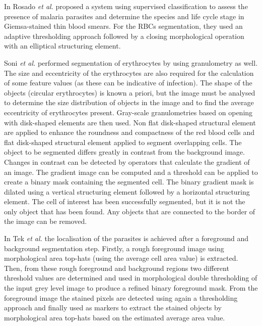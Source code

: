 \documentclass[sensors,review,submit,moreauthors,pdftex,10pt,a4paper]{mdpi}
\begin{document}
In \cite{Rosado2017} Rosado \emph{et al.} proposed a system using supervised classification to assess the presence of malaria parasites and determine the species and life cycle stage in Giemsa-stained thin blood smears. For the RBCs segmentation, they used an adaptive thresholding approach followed by a closing morphological operation with an elliptical structuring element.

Soni \emph{et al.} \cite{Soni2011} performed segmentation of erythrocytes by using granulometry as well. The size and eccentricity of the erythrocytes are also required for the calculation of some feature values (as these can be indicative of infection). The shape of the objects (circular erythrocytes) is known a priori, but the image must be analysed to determine the size distribution of objects in the image and to find the average eccentricity of erythrocytes present.
Gray-scale granulometries based on opening with disk-shaped elements are then used. Non flat disk-shaped structural element are applied to enhance the roundness and compactness of the red blood cells and flat disk-shaped structural element applied to segment overlapping cells. The object to be segmented differs greatly in contrast from the background image. Changes in contrast can be detected by operators that calculate the gradient of an image. The gradient image can be computed and a threshold can be applied to create a binary mask containing the segmented cell. The binary gradient mask is dilated using a vertical structuring element followed by a horizontal structuring element. The cell of interest has been successfully segmented, but it is not the only object that has been found. Any objects that are connected to the border of the image can be removed.

In \cite{Tek2010} Tek \emph{et al.} the localisation of the parasites is achieved after a foreground and background segmentation step. Firstly, a rough foreground image using morphological area top-hats (using the average cell area value) is extracted. Then, from these rough foreground and background regions two different threshold values are determined and used in morphological double thresholding of the input grey level image to produce a refined binary foreground mask. From the foreground image the stained pixels are detected using again a thresholding approach and finally used as markers to extract the stained objects by morphological area top-hats based on the estimated average area value.
\end{document}
